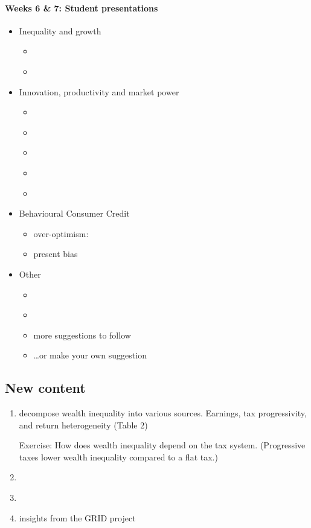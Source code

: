 \documentclass[a4paper,12pt]{article}
\begin{document}
\paragraph{Weeks 6 \& 7: Student presentations}

\begin{itemize}
\item Inequality and growth
  \begin{itemize}
  \item \citet{moll2022uneven}
  \item \citet{lippi2021unequal}
  \end{itemize}
\item Innovation, productivity and market power
  \begin{itemize}
  \item \citet{deloecker2020market-power}
  \item \citet{liu2022interest-power}
  \item \citet{akcigit2019business-dynamism}
  \item \citet{aghion2018innovation-inequality}
  \item \citet{acemoglu2018innovation-growth}
  \end{itemize}
\item Behavioural Consumer Credit
  \begin{itemize}
  \item over-optimism: \citep{exler2020over-optimistic}
  \item present bias \citep{laibson2021present}
  \end{itemize}
\item Other
  \begin{itemize}
  \item \citet{bailey2019beliefs-leverage}
  \item \citet{laibson2022mpc-to-mpx}
  \item more suggestions to follow
  \item \dots or make your own suggestion
  \end{itemize}
\end{itemize}

\subsection*{New content}

\begin{enumerate}
  \item \citet{hubmer2021sources} decompose wealth inequality into various sources. Earnings, tax progressivity, and return heterogeneity (Table 2)

  Exercise: How does wealth inequality depend on the tax system. (Progressive taxes lower wealth inequality compared to a flat tax.)

  \item \citet{guvenen2023use}
  \item \citet{fagereng2022asset}
  \item \citet{guvenen2022global} insights from the GRID project
\end{enumerate}
\end{document}
